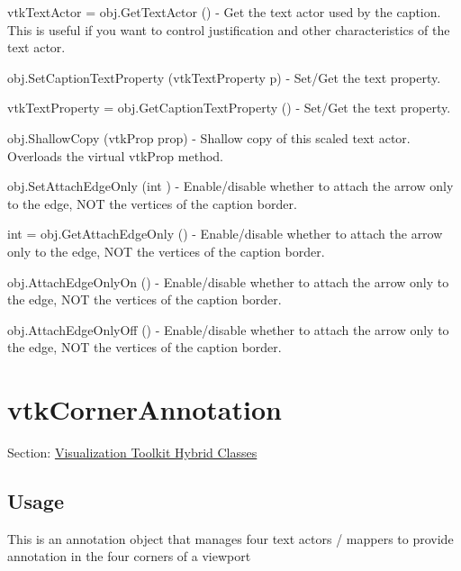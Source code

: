 \begin{DoxyItemize}
\item {\ttfamily vtk\-Text\-Actor = obj.\-Get\-Text\-Actor ()} -\/ Get the text actor used by the caption. This is useful if you want to control justification and other characteristics of the text actor.  
\item {\ttfamily obj.\-Set\-Caption\-Text\-Property (vtk\-Text\-Property p)} -\/ Set/\-Get the text property.  
\item {\ttfamily vtk\-Text\-Property = obj.\-Get\-Caption\-Text\-Property ()} -\/ Set/\-Get the text property.  
\item {\ttfamily obj.\-Shallow\-Copy (vtk\-Prop prop)} -\/ Shallow copy of this scaled text actor. Overloads the virtual vtk\-Prop method.  
\item {\ttfamily obj.\-Set\-Attach\-Edge\-Only (int )} -\/ Enable/disable whether to attach the arrow only to the edge, N\-O\-T the vertices of the caption border.  
\item {\ttfamily int = obj.\-Get\-Attach\-Edge\-Only ()} -\/ Enable/disable whether to attach the arrow only to the edge, N\-O\-T the vertices of the caption border.  
\item {\ttfamily obj.\-Attach\-Edge\-Only\-On ()} -\/ Enable/disable whether to attach the arrow only to the edge, N\-O\-T the vertices of the caption border.  
\item {\ttfamily obj.\-Attach\-Edge\-Only\-Off ()} -\/ Enable/disable whether to attach the arrow only to the edge, N\-O\-T the vertices of the caption border.  
\end{DoxyItemize}\hypertarget{vtkhybrid_vtkcornerannotation}{}\section{vtk\-Corner\-Annotation}\label{vtkhybrid_vtkcornerannotation}
Section\-: \hyperlink{sec_vtkhybrid}{Visualization Toolkit Hybrid Classes} \hypertarget{vtkwidgets_vtkxyplotwidget_Usage}{}\subsection{Usage}\label{vtkwidgets_vtkxyplotwidget_Usage}
This is an annotation object that manages four text actors / mappers to provide annotation in the four corners of a viewport

